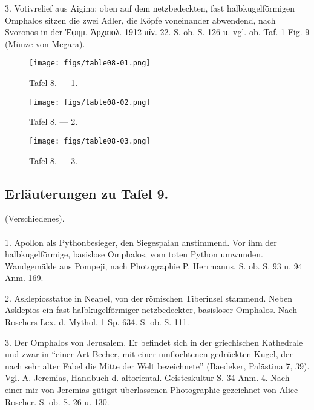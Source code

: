\documentclass[a4paper, 11pt, oneside]{article}
\begin{document}
3. Votivrelief aus Aigina: oben auf dem netzbedeckten, fast halbkugelförmigen Omphalos sitzen die zwei Adler, die Köpfe voneinander abwendend, nach Svoronos in der Ἐφημ. Ἀρχαιολ. 1912 πίν. 22. S. ob. S. 126 u. vgl. ob. Taf. 1 Fig. 9 (Münze von Megara).
\clearpage
\clearpage
\vspace*{\fill}
\begin{figure}[H]
\centering
\texttt{[image: figs/table08-01.png]}
\caption{Tafel 8. --- 1.}
\end{figure}
\vspace*{\fill}
\clearpage
\vspace*{\fill}
\begin{figure}[H]
\centering
\texttt{[image: figs/table08-02.png]}
\caption{Tafel 8. --- 2.}
\end{figure}
\vspace*{\fill}
\clearpage
\vspace*{\fill}
\begin{figure}[H]
\centering
\texttt{[image: figs/table08-03.png]}
\caption{Tafel 8. --- 3.}
\end{figure}
\vspace*{\fill}
\clearpage

\subsection{Erläuterungen zu Tafel 9.}
\begin{center}
(Verschiedenes).
\end{center}
\paragraph{}
1. Apollon als Pythonbesieger, den Siegespaian anstimmend. Vor ihm der halbkugelförmige, basislose Omphalos, vom toten Python umwunden. Wandgemälde aus Pompeji, nach Photographie P. Herrmanns. S. ob. S. 93 u. 94 Anm. 169.

2. Asklepiosstatue in Neapel, von der römischen Tiberinsel stammend. Neben Asklepios ein fast halbkugelförmiger netzbedeckter, basisloser Omphalos. Nach Roschers Lex. d. Mythol. 1 Sp. 634. S. ob. S. 111.

3. Der Omphalos von Jerusalem. Er befindet sich in der griechischen Kathedrale und zwar in "`einer Art Becher, mit einer umflochtenen gedrückten Kugel, der nach sehr alter Fabel die Mitte der Welt bezeichnete"' (Baedeker, Palästina 7, 39). Vgl. A. Jeremias, Handbuch d. altoriental. Geisteskultur S. 34 Anm. 4. Nach einer mir von Jeremias gütigst überlassenen Photographie gezeichnet von Alice Roscher. S. ob. S. 26 u. 130.
\end{document}
